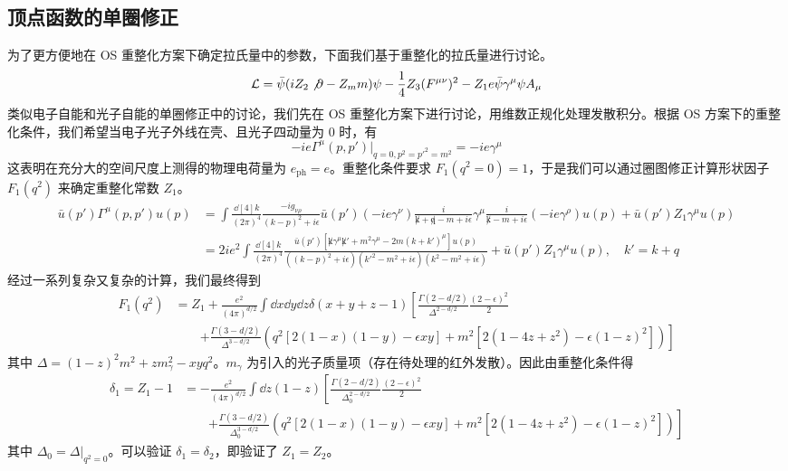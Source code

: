 \subsection{顶点函数的单圈修正}
为了更方便地在 OS 重整化方案下确定拉氏量中的参数，下面我们基于重整化的拉氏量进行讨论。
\begin{equation}
\mathcal{L}=\bar\psi (iZ_2\not\partial - Z_m m)\psi - \frac{1}{4}Z_3 (F^{\mu\nu})^2-Z_1 e \bar\psi \gamma^\mu\psi A_\mu
\end{equation}
类似电子自能和光子自能的单圈修正中的讨论，我们先在 OS 重整化方案下进行讨论，用维数正规化处理发散积分。根据 OS 方案下的重整化条件，我们希望当电子光子外线在壳、且光子四动量为 $0$ 时，有
\begin{equation}
-ie\Gamma^\mu(p,p')|_{q=0,p^2={p'}^2=m^2} = -ie\gamma^\mu
\end{equation}
这表明在充分大的空间尺度上测得的物理电荷量为 $e_{\text{ph}}=e$。重整化条件要求 $F_1(q^2=0)=1$，于是我们可以通过圈图修正计算形状因子 $F_1(q^2)$ 来确定重整化常数 $Z_1$。
\begin{equation}
\begin{aligned}
\bar u(p')\Gamma^\mu(p,p')u(p) &=\int\frac{\dd[4]{k}}{(2\pi)^4} \frac{-i g_{\nu\rho}}{(k-p)^2+i\epsilon} \bar u(p')(-ie\gamma^\nu)\frac{i}{\not k+\not q-m+i\epsilon}\gamma^\mu \frac{i}{\not k-m+i\epsilon} (-ie\gamma^\rho) u(p)
+\bar u(p')Z_1\gamma^\mu u(p)\\
&=2ie^2\int\frac{\dd[4]{k}}{(2\pi)^4} \frac{\bar u(p') [\not k \gamma^\mu \not k'+m^2\gamma^\mu - 2m(k+k')^\mu]u(p)}{((k-p)^2+i\epsilon)({k'}^2-m^2+i\epsilon)(k^2-m^2+i\epsilon)} + \bar u(p') Z_1 \gamma^\mu u(p),\quad k' = k+q
\end{aligned}
\end{equation}
经过一系列复杂又复杂的计算，我们最终得到
\begin{equation}
\begin{aligned}
F_1(q^2)&=Z_1 + \frac{e^2}{(4\pi)^{d/2}}\int\dd x\dd y\dd z\delta(x+y+z-1)\left[\frac{\Gamma(2-d/2)}{\Delta^{2-d/2}}\frac{(2-\epsilon)^2}{2}\right.\\
&\quad\quad\left.+\frac{\Gamma(3-d/2)}{\Delta^{3-d/2}}(q^2[2(1-x)(1-y)-\epsilon xy]+m^2[2(1-4z+z^2)-\epsilon(1-z)^2])
\right]
\end{aligned}
\end{equation}
其中 $\Delta =(1-z)^2m^2+zm_\gamma^2 - xyq^2$。$m_\gamma$ 为引入的光子质量项（存在待处理的红外发散）。因此由重整化条件得
\begin{equation}
\begin{aligned}
\delta_1 = Z_1-1 &= -\frac{e^2}{(4\pi)^{d/2}}\int\dd z(1-z)\left[\frac{\Gamma(2-d/2)}{\Delta_0^{2-d/2}}\frac{(2-\epsilon)^2}{2}\right.\\
&\quad\quad\left.+\frac{\Gamma(3-d/2)}{\Delta_0^{3-d/2}}(q^2[2(1-x)(1-y)-\epsilon xy]+m^2[2(1-4z+z^2)-\epsilon(1-z)^2])
\right]
\end{aligned}
\end{equation}
其中 $\Delta_0 = \Delta|_{q^2=0}$。可以验证 $\delta_1=\delta_2$，即验证了 $Z_1=Z_2$。

